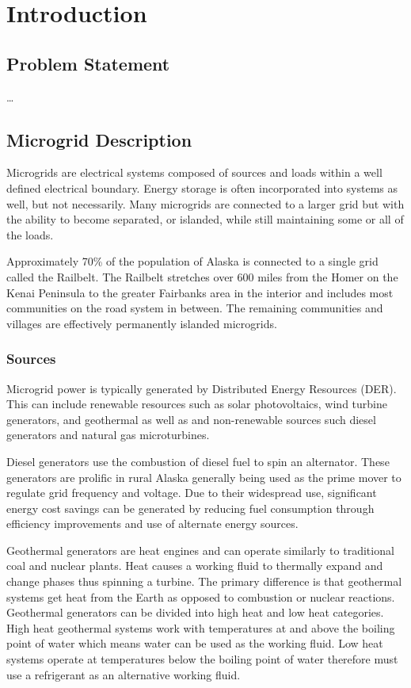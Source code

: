 \chapter{Introduction}

\section{Problem Statement}

\ldots

\section{Microgrid Description}
Microgrids are electrical systems composed of sources and loads within a well defined electrical boundary. Energy storage is often incorporated into systems as well, but not necessarily. Many microgrids are connected to a larger grid but with the ability to become separated, or islanded, while still maintaining some or all of the loads.

Approximately 70\% of the population of Alaska is connected to a single grid called the Railbelt. \cite{railbelt} The Railbelt stretches over 600 miles from the Homer on the Kenai Peninsula to the greater Fairbanks area in the interior and includes most communities on the road system in between. The remaining communities and villages are effectively permanently islanded microgrids. 

\subsection{Sources}
Microgrid power is typically generated by Distributed Energy Resources (DER). This can include renewable resources such as solar photovoltaics, wind turbine generators, and geothermal as well as and non-renewable sources such diesel generators and natural gas microturbines. 

Diesel generators use the combustion of diesel fuel to spin an alternator. These generators are prolific in rural Alaska generally being used as the prime mover to regulate grid frequency and voltage. 
Due to their widespread use, significant energy cost savings can be generated by reducing fuel consumption through efficiency improvements and use of alternate energy sources.

Geothermal generators are heat engines and can operate similarly to traditional coal and nuclear plants. Heat causes a working fluid to thermally expand and change phases thus spinning a turbine. The primary difference is that geothermal systems get heat from the Earth as opposed to combustion or nuclear reactions. Geothermal generators can be divided into high heat and low heat categories. High heat geothermal systems work with temperatures at and above the boiling point of water which means water can be used as the working fluid. Low heat systems operate at temperatures below the boiling point of water therefore must use a refrigerant as an alternative working fluid. 

